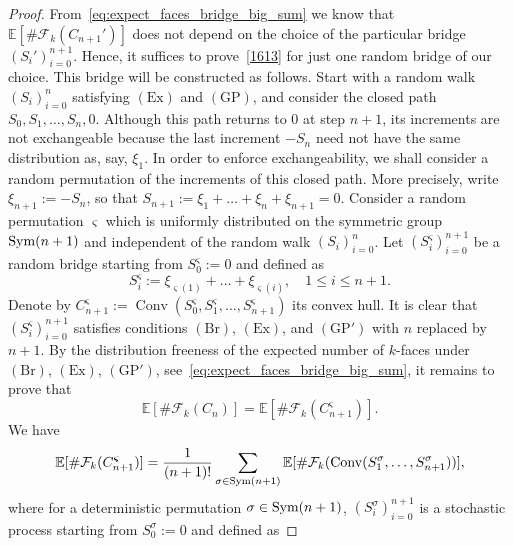 \documentclass[12pt, reqno]{amsart}
\theoremstyle{plain}
\theoremstyle{definition}
\theoremstyle{remark}
\begin{document}
\begin{proof}
From~\eqref{eq:expect_faces_bridge_big_sum} we know that ${\mathbb E} [\#\mathcal{F}_k(C_{n+1}')]$ does not depend on the choice of the particular bridge $(S_i')_{i=0}^{n+1}$. Hence, it suffices to prove~\eqref{1613} for just one random bridge of our choice. This bridge will be constructed as follows.
Start with a random walk $(S_i)_{i=0}^n$ satisfying $(\text{Ex})$ and $(\text{GP})$, and consider the closed path $S_0,S_1,\ldots, S_n, 0$.  Although this path returns to $0$ at step $n+1$,  its increments are not exchangeable because the last increment $-S_n$ need not have the same distribution as, say, $\xi_1$. In order to enforce exchangeability, we shall consider a random permutation of the increments of this closed path.
More precisely, write $\xi_{n+1}:=-S_n$, so that $S_{n+1}:=\xi_1+\dots+\xi_n+\xi_{n+1}=0$.
Consider a random permutation ${{\boldsymbol{\varsigma}}}$ which is uniformly distributed on the symmetric group ${\text{\rm Sym}}(n+1)$ and independent of the random walk $(S_i)_{i=0}^n$. Let $(S^{{\boldsymbol{\varsigma}}}_i)_{i=0}^{n+1}$ be a random bridge starting from $S^{{\boldsymbol{\varsigma}}}_0:=0$ and defined as
$$
S^{{\boldsymbol{\varsigma}}}_i:=\xi_{{{\boldsymbol{\varsigma}}}(1)}+\dots+\xi_{{{\boldsymbol{\varsigma}}}(i)}, \quad 1\leq i \leq n+1.
$$
Denote by $C^{{\boldsymbol{\varsigma}}}_{n+1}:={\mathop{\mathrm{Conv}}\nolimits}(S^{{\boldsymbol{\varsigma}}}_0,S^{{\boldsymbol{\varsigma}}}_1,\ldots,S^{{\boldsymbol{\varsigma}}}_{n+1})$ its convex hull. It is clear that $(S^{{\boldsymbol{\varsigma}}}_i)_{i=0}^{n+1}$ satisfies conditions $(\text{Br})$, $(\text{Ex})$, and $(\text{GP}')$ with $n$ replaced by $n+1$.
By the distribution freeness of the expected number of $k$-faces under $(\text{Br})$, $(\text{Ex})$, $(\text{GP}')$, see~\eqref{eq:expect_faces_bridge_big_sum}, it remains to prove that
\begin{equation}\label{1614}
{\mathbb E} [\#\mathcal{F}_k(C_n)]={\mathbb E} [\#\mathcal{F}_k(C^{{\boldsymbol{\varsigma}}}_{n+1})].
\end{equation}
We have
\begin{equation}\label{1838}
{\mathbb E} [\#\mathcal{F}_k(C^{{\boldsymbol{\varsigma}}}_{n+1})]=\frac{1}{(n+1)!}\sum_{\sigma\in{\text{\rm Sym}}(n+1)}{\mathbb E} [\#\mathcal{F}_k({\mathop{\mathrm{Conv}}\nolimits}(S^\sigma_1,\dots,S^\sigma_{n+1}))],
\end{equation}
where for a deterministic permutation $\sigma\in {\text{\rm Sym}}(n+1)$, $(S^{\sigma}_i)_{i=0}^{n+1}$ is a stochastic process starting from $S^{\sigma}_0:=0$  and defined as

\end{proof}
\end{document}
